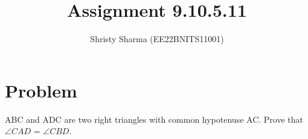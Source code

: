 \documentclass[journal,12pt,twocolumn]{IEEEtran}
\begin{document}
\makeatletter
{}
\makeatother
\let\StandardTheFigure\thefigure
\let\vec\mathbf
\renewcommand{\thefigure}{\theproblem}
\def\putbox#1#2#3{\makebox[0in][l]{\makebox[#1][l]{}\raisebox{\baselineskip}[0in][0in]{\raisebox{#2}[0in][0in]{#3}}}}
     \def\rightbox#1{\makebox[0in][r]{#1}}
     \def\centbox#1{\makebox[0in]{#1}}
     \def\topbox#1{\raisebox{-\baselineskip}[0in][0in]{#1}}
     \def\midbox#1{\raisebox{-0.5\baselineskip}[0in][0in]{#1}}
\vspace{3cm}
\title{Assignment 9.10.5.11}
\author{Shristy Sharma (EE22BNITS11001)}
\maketitle
\newpage
\bigskip
\renewcommand{\thefigure}{\theenumi}
\renewcommand{\thetable}{\theenumi}
\section{Problem}
ABC and ADC are two right triangles with common hypotenuse AC. Prove that
$\angle CAD$ = $\angle CBD$.
\end{document}
